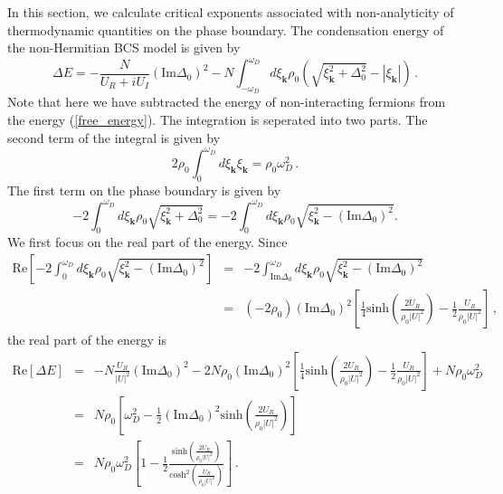 \documentclass[aps,onecolumn,nofootinbib,superscriptaddress,notitlepage,longbibliography]{revtex4-1}
\begin{document}
In this section, we calculate critical exponents associated with non-analyticity of thermodynamic quantities on the phase boundary. The condensation energy of the non-Hermitian BCS model is given by \cite{Yamamoto2019}
\begin{equation}
 \Delta E = - \frac{N}{U_R + i U_I} \left( \text{Im} \Delta_0 \right)^2
  - N \int_{- \omega_D}^{\omega_D} d \xi_{\bm{k}} \rho_0 \left( \sqrt{\xi_{\bm{k}}^2 +
  \Delta_0^2} - | \xi_{\bm{k}} | \right)\,.\label{free_energy}
\end{equation}
Note that here we have subtracted the energy of non-interacting fermions from the energy (\ref{free_energy}). The integration is seperated into two parts. The second term of the integral is given by
\begin{equation}
  2 \rho_0 \int_0^{\omega_D} d \xi_{\bm{k}} \xi_{\bm{k}} = \rho_0 \omega_D^2\,.
\end{equation}
The first term on the phase boundary is given by
\[ - 2 \int_0^{\omega_D} d \xi_{\bm{k}} \rho_0 \sqrt{\xi_{\bm{k}}^2 + \Delta_0^2} = - 2
   \int_0^{\omega_D} d \xi_{\bm{k}} \rho_0 \sqrt{\xi_{\bm{k}}^2 - \left( \text{Im} \Delta_0
   \right)^2}. \]
We first focus on the real part of the energy. Since
\begin{eqnarray}
  \text{Re}\left[- 2 \int_0^{\omega_D} d \xi_{\bm{k}} \rho_0 \sqrt{\xi_{\bm{k}}^2 - \left( \text{Im}
  \Delta_0 \right)^2}\right] & = & - 2 \int_{\text{Im} \Delta_0}^{\omega_D}
  d \xi_{\bm{k}} \rho_0 \sqrt{\xi_{\bm{k}}^2 - \left( \text{Im} \Delta_0 \right)^2}
  \nonumber\\
  & = & (- 2 \rho_0) \left( \text{Im} \Delta_0 \right)^2 \left[ \frac{1}{4}
  \text{sinh} \left( \frac{2 U_R}{\rho_0 | U |^2} \right) - \frac{1}{2}
  \frac{U_R}{\rho_0 | U |^2} \right]\,,
\end{eqnarray}
the real part of the energy is
\begin{eqnarray}
  \text{Re} [\Delta E] & = & - N \frac{U_R}{| U |^2} \left( \text{Im} \Delta_0
  \right)^2 - 2 N \rho_0 \left( \text{Im} \Delta_0 \right)^2 \left[
  \frac{1}{4} \text{sinh} \left( \frac{2 U_R}{\rho_0 | U |^2} \right) -
  \frac{1}{2} \frac{U_R}{\rho_0 | U |^2} \right] + N \rho_0 \omega_D^2
  \nonumber\\
  & = & N \rho_0 \left[ \omega_D^2 - \frac{1}{2} \left( \text{Im} \Delta_0
  \right)^2 \text{sinh} \left( \frac{2 U_R}{\rho_0 | U |^2} \right) \right]
  \nonumber\\
  & = & N \rho_0 \omega_D^2 \left[ 1 - \frac{1}{2} \frac{\text{sinh} \left(
  \frac{2 U_R}{\rho_0 | U |^2} \right)}{\text{cosh}^2 \left( \frac{U_R}{\rho_0
  | U |^2} \right)} \right]\,.
  \label{free}
\end{eqnarray}
\end{document}
